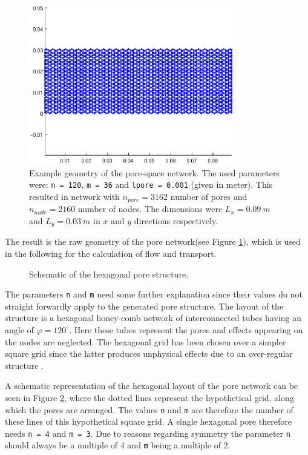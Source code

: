 \documentclass[12pt]{report}
\newcommand*{\PsTricksPath}{pstricks}
\begin{document}
\begin{figure}[ht]
	\centering
	\includegraphics[width=0.8\textwidth]{MainPoreNetwork_01}
	\caption[]{Example geometry of the pore-space network. The used parameters were: {\tt n = 120}, {\tt m = 36} and {\tt l\textunderscore pore = 0.001} (given in meter). This resulted in network with $n_{pore} = 3162$ number of pores and $n_{node} = 2160$ number of nodes. The dimensions were $L_x = 0.09\ m$ and $L_y = 0.03\ m$ in $x$ and $y$ directions respectively.} 
	\label{fig:geometry}
\end{figure}

The result is the raw geometry of the pore network(see Figure \ref{fig:geometry}), which is used in the following for the calculation of flow and transport.

\begin{figure}[ht]
	\centering
	
	\caption{Schematic of the hexagonal pore structure.}
	\label{fig:PoreStructure}
\end{figure}

The parameters {\tt n} and {\tt m} need some further explanation since their values do not straight forwardly apply to the generated pore structure. The layout of the structure is a hexagonal honey-comb network of interconnected tubes having an angle of $\varphi = 120^{\circ}$. Here these tubes represent the pores and effects appearing on the nodes are neglected. The hexagonal grid has been chosen over a simpler square grid since the latter produces unphysical effects due to an over-regular structure \citep{Dupin2001}.

A schematic representation of the hexagonal layout of the pore network can be seen in Figure \ref{fig:PoreStructure}, where the dotted lines represent the hypothetical grid, along which the pores are arranged. The values {\tt n} and {\tt m} are therefore the number of these lines of this hypothetical square grid. A single hexagonal pore therefore needs {\tt n = 4} and {\tt m = 3}. Due to reasons regarding symmetry the parameter {\tt n} should always be a multiple of 4 and {\tt m} being a multiple of 2. 
\end{document}
